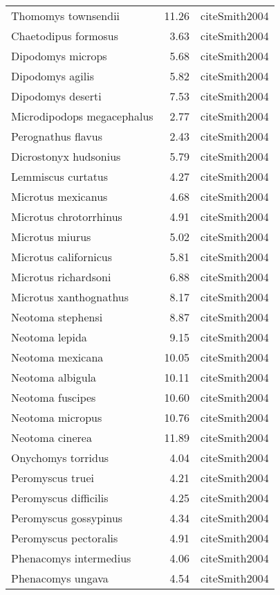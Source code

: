 \begin{table}[ht]
\begin{tabular}{lrl}
  Thomomys townsendii & 11.26 & cite{Smith2004} \\ 
  Chaetodipus formosus & 3.63 & cite{Smith2004} \\ 
  Dipodomys microps & 5.68 & cite{Smith2004} \\ 
  Dipodomys agilis & 5.82 & cite{Smith2004} \\ 
  Dipodomys deserti & 7.53 & cite{Smith2004} \\ 
  Microdipodops megacephalus & 2.77 & cite{Smith2004} \\ 
  Perognathus flavus & 2.43 & cite{Smith2004} \\ 
  Dicrostonyx hudsonius & 5.79 & cite{Smith2004} \\ 
  Lemmiscus curtatus & 4.27 & cite{Smith2004} \\ 
  Microtus mexicanus & 4.68 & cite{Smith2004} \\ 
  Microtus chrotorrhinus & 4.91 & cite{Smith2004} \\ 
  Microtus miurus & 5.02 & cite{Smith2004} \\ 
  Microtus californicus & 5.81 & cite{Smith2004} \\ 
  Microtus richardsoni & 6.88 & cite{Smith2004} \\ 
  Microtus xanthognathus & 8.17 & cite{Smith2004} \\ 
  Neotoma stephensi & 8.87 & cite{Smith2004} \\ 
  Neotoma lepida & 9.15 & cite{Smith2004} \\ 
  Neotoma mexicana & 10.05 & cite{Smith2004} \\ 
  Neotoma albigula & 10.11 & cite{Smith2004} \\ 
  Neotoma fuscipes & 10.60 & cite{Smith2004} \\ 
  Neotoma micropus & 10.76 & cite{Smith2004} \\ 
  Neotoma cinerea & 11.89 & cite{Smith2004} \\ 
  Onychomys torridus & 4.04 & cite{Smith2004} \\ 
  Peromyscus truei & 4.21 & cite{Smith2004} \\ 
  Peromyscus difficilis & 4.25 & cite{Smith2004} \\ 
  Peromyscus gossypinus & 4.34 & cite{Smith2004} \\ 
  Peromyscus pectoralis & 4.91 & cite{Smith2004} \\ 
  Phenacomys intermedius & 4.06 & cite{Smith2004} \\ 
  Phenacomys ungava & 4.54 & cite{Smith2004} \\ 

\end{tabular}
\end{table}

